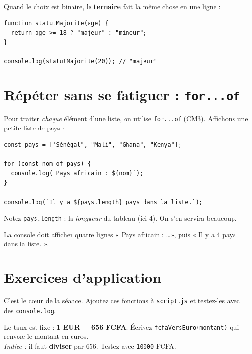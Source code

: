 \documentclass[11pt,a4paper]{article}
\newcommand{\code}[1]{\texttt{#1}}
\begin{document}
Quand le choix est binaire, le \textbf{ternaire} fait la même chose en une ligne :

\begin{lstlisting}[style=js]
function statutMajorite(age) {
  return age >= 18 ? "majeur" : "mineur";
}

console.log(statutMajorite(20)); // "majeur"
\end{lstlisting}

\section{Répéter sans se fatiguer : \texttt{for...of}}

Pour traiter \emph{chaque} élément d'une liste, on utilise \code{for...of} (CM3). Affichons une petite liste de pays :

\begin{lstlisting}[style=js]
const pays = ["Sénégal", "Mali", "Ghana", "Kenya"];

for (const nom of pays) {
  console.log(`Pays africain : ${nom}`);
}

console.log(`Il y a ${pays.length} pays dans la liste.`);
\end{lstlisting}

Notez \code{pays.length} : la \emph{longueur} du tableau (ici 4). On s'en servira beaucoup.

\begin{infobox}[Vérification]
La console doit afficher quatre lignes « Pays africain : \ldots », puis « Il y a 4 pays dans la liste. ».
\end{infobox}

\section{Exercices d'application}

C'est le cœur de la séance. Ajoutez ces fonctions à \code{script.js} et testez-les avec des \code{console.log}.

\begin{objectifbox}
Le taux est fixe : \textbf{1 EUR = 656 FCFA}. Écrivez \code{fcfaVersEuro(montant)} qui renvoie le montant en euros.\\
\emph{Indice :} il faut \textbf{diviser} par 656. Testez avec \code{10000} FCFA.
\end{objectifbox}
\end{document}

